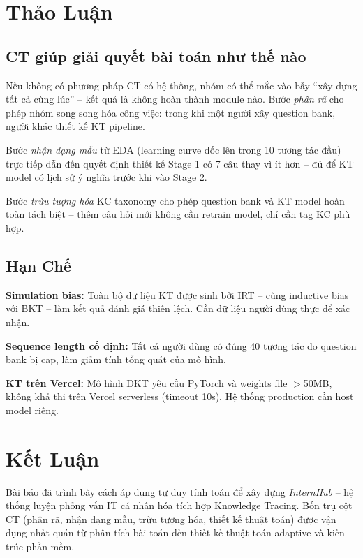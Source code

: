 \documentclass[conference]{IEEEtran}
\newcommand{\sys}{\textit{InternHub}}
\begin{document}
\section{Thảo Luận}
\label{sec:discussion}

\subsection{CT giúp giải quyết bài toán như thế nào}

Nếu không có phương pháp CT có hệ thống, nhóm có thể mắc vào bẫy ``xây dựng tất cả cùng lúc'' -- kết quả là không hoàn thành module nào. Bước \textit{phân rã} cho phép nhóm song song hóa công việc: trong khi một người xây question bank, người khác thiết kế KT pipeline.

Bước \textit{nhận dạng mẫu} từ EDA (learning curve dốc lên trong 10 tương tác đầu) trực tiếp dẫn đến quyết định thiết kế Stage 1 có 7 câu thay vì ít hơn -- đủ để KT model có lịch sử ý nghĩa trước khi vào Stage 2.

Bước \textit{trừu tượng hóa} KC taxonomy cho phép question bank và KT model hoàn toàn tách biệt -- thêm câu hỏi mới không cần retrain model, chỉ cần tag KC phù hợp.

\subsection{Hạn Chế}

\textbf{Simulation bias:} Toàn bộ dữ liệu KT được sinh bởi IRT -- cùng inductive bias với BKT -- làm kết quả đánh giá thiên lệch. Cần dữ liệu người dùng thực để xác nhận.

\textbf{Sequence length cố định:} Tất cả người dùng có đúng 40 tương tác do question bank bị cap, làm giảm tính tổng quát của mô hình.

\textbf{KT trên Vercel:} Mô hình DKT yêu cầu PyTorch và weights file $>$50MB, không khả thi trên Vercel serverless (timeout 10s). Hệ thống production cần host model riêng.

\section{Kết Luận}
\label{sec:conclusion}

Bài báo đã trình bày cách áp dụng tư duy tính toán để xây dựng \sys{} -- hệ thống luyện phỏng vấn IT cá nhân hóa tích hợp Knowledge Tracing. Bốn trụ cột CT (phân rã, nhận dạng mẫu, trừu tượng hóa, thiết kế thuật toán) được vận dụng nhất quán từ phân tích bài toán đến thiết kế thuật toán adaptive và kiến trúc phần mềm.
\end{document}
